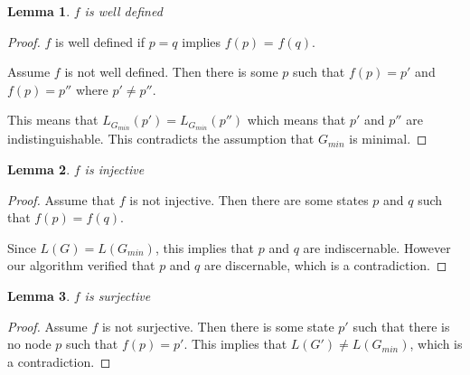 \documentclass[12pt]{article}
\newtheorem{lemma}{Lemma}
\begin{document}
\begin{lemma}
\label{thm:bijection2}
$f$ is well defined
\end{lemma}
\begin{proof}
$f$ is well defined if $p=q$ implies $f(p)$ = $f(q)$.

Assume $f$ is not well defined. Then there is some $p$ such that
$f(p)=p'$ and $f(p)=p''$ where $p' \neq p''$.

This means that $L_{G_{min}}(p') = L_{G_{min}}(p'')$ which means that $p'$
and $p''$ are indistinguishable. This contradicts the assumption that
$G_{min}$ is minimal.
\end{proof}

\begin{lemma}
\label{thm:bijection3}
$f$ is injective
\end{lemma}
\begin{proof}
Assume that $f$ is not injective. Then there are some states $p$ and $q$
such that $f(p)=f(q)$.

Since $L(G)=L(G_{min})$, this implies that $p$ and $q$ are indiscernable.
However our algorithm verified that $p$ and $q$ are discernable, which
is a contradiction.
\end{proof}

\begin{lemma}
\label{thm:bijection4}
$f$ is surjective
\end{lemma}
\begin{proof}
Assume $f$ is not surjective. Then there is some state $p'$ such that there
is no node $p$ such that $f(p)=p'$. This implies that $L(G') \neq L(G_{min})$,
which is a contradiction.
\end{proof}
\end{document}
